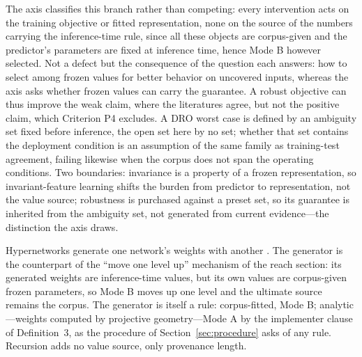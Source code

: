 The axis classifies this branch rather than competing: every intervention acts on the training objective or fitted representation, none on the source of the numbers carrying the inference-time rule, since all these objects are corpus-given and the predictor's parameters are fixed at inference time, hence Mode B however selected. Not a defect but the consequence of the question each answers: how to select among frozen values for better behavior on uncovered inputs, whereas the axis asks whether frozen values can carry the guarantee. A robust objective can thus improve the weak claim, where the literatures agree, but not the positive claim, which Criterion P4 excludes. A DRO worst case is defined by an ambiguity set fixed before inference, the open set here by no set; whether that set contains the deployment condition is an assumption of the same family as training-test agreement, failing likewise when the corpus does not span the operating conditions. Two boundaries: invariance is a property of a frozen representation, so invariant-feature learning shifts the burden from predictor to representation, not the value source; robustness is purchased against a preset set, so its guarantee is inherited from the ambiguity set, not generated from current evidence---the distinction the axis draws.

Hypernetworks generate one network's weights with another \citep{ha2016}. The generator is the counterpart of the ``move one level up'' mechanism of the reach section: its generated weights are inference-time values, but its own values are corpus-given frozen parameters, so Mode B moves up one level and the ultimate source remains the corpus. The generator is itself a rule: corpus-fitted, Mode B; analytic---weights computed by projective geometry---Mode A by the implementer clause of Definition~3, as the procedure of Section~\ref{sec:procedure} asks of any rule. Recursion adds no value source, only provenance length.

